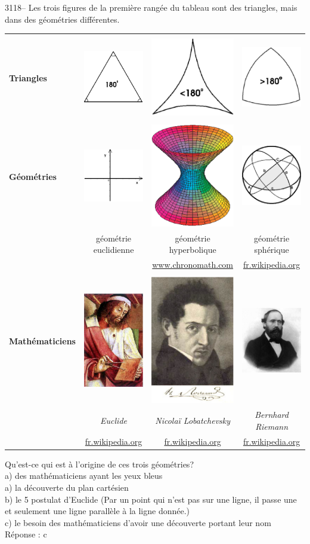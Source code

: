 \documentclass[letterpaper, 12pt]{article}
\begin{document}
3118-- Les trois figures de la premi\`ere rang\'ee du tableau sont des triangles, mais dans des g\'eom\'etries diff\'erentes.
\begin{center}
\begin{tabular}{|l|c|c|c|}\hline
 & & & \\
{\bf Triangles} & \includegraphics[scale=0.25]{180egal.eps} & \includegraphics[scale=0.25]{180moins.eps} & \includegraphics[scale=0.25]{180plus.eps}\\[2mm] \hline
 & & & \\
{\bf G\'eom\'etries} & \includegraphics[scale=0.19]{euclidienne.eps} & \includegraphics[scale=0.195]{lobatchevskian.eps} & \includegraphics[scale=0.2]{riemanienne.eps}\\[2mm]
 & g\'eom\'etrie euclidienne & g\'eom\'etrie hyperbolique & g\'eom\'etrie sph\'erique\\
& & \href{http://www.chronomath.com}{www.chronomath.com} & \href{http://fr.wikipedia.org/wiki/Trigonom\%C3\%A9trie_sph\%C3\%A9rique}{fr.wikipedia.org}\\ \hline
 & & & \\
{\bf Math\'ematiciens} & \includegraphics[scale=0.13]{euclide.eps} & \includegraphics[scale=0.15]{lobatchevsky.eps} & \includegraphics[scale=0.12]{riemann.eps}\\
& \emph{{\small Euclide}} & \emph{{\small Nicola\"i Lobatchevsky}} & \emph{{\small Bernhard Riemann}}\\
& \href{http://fr.wikipedia.org/wiki/Euclide}{fr.wikipedia.org} & \href{http://fr.wikipedia.org/wiki/Nicola\%C3\%AF_Lobatchevsky}{fr.wikipedia.org} & \href{http://fr.wikipedia.org/wiki/Riemann}{fr.wikipedia.org}\\ \hline
\end{tabular}
\end{center}

Qu'est-ce qui est \`a l'origine de ces trois g\'eom\'etries?\\

a) des math\'ematiciens ayant les yeux bleus\\
a) la d\'ecouverte du plan cart\'esien\\
b) le 5\ieme{} postulat d'Euclide (Par un point qui n'est pas sur une ligne, il passe une et seulement une ligne parall\`ele \`a la ligne donn\'ee.)\\
c) le besoin des math\'ematiciens d'avoir une d\'ecouverte portant leur nom\\

R\'eponse : c
\end{document}
